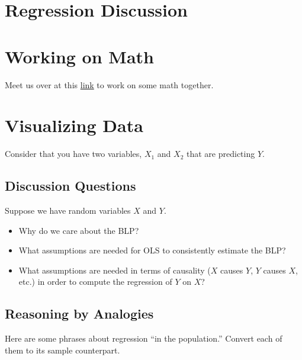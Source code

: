 \documentclass[
]{book}
\providecommand{\tightlist}{%
  \setlength{\itemsep}{0pt}\setlength{\parskip}{0pt}}
\theoremstyle{definition}
\theoremstyle{definition}
\theoremstyle{definition}
\theoremstyle{definition}
\theoremstyle{remark}
\begin{document}
\hypertarget{regression-discussion}{%
\section{Regression Discussion}\label{regression-discussion}}

\hypertarget{working-on-math}{%
\section{Working on Math}\label{working-on-math}}

Meet us over at this \href{https://miro.com/welcomeonboard/OWZ3SHlpeVBMYjdnc2xXUFhzQVNWaFpnTkg2dmF1Z3I1UUJBWVZobWFOeVduSHJNTTRSQUt3akVyQUt0MnAyM3wzNDU4NzY0NTE4MDA4MjA1NTc3?invite_link_id=319921528710}{link} to work on some math together.

\hypertarget{visualizing-data}{%
\section{Visualizing Data}\label{visualizing-data}}

Consider that you have two variables, \(X_{1}\) and \(X_{2}\) that are predicting \(Y\).

\hypertarget{discussion-questions-1}{%
\subsection{Discussion Questions}\label{discussion-questions-1}}

Suppose we have random variables \(X\) and \(Y\).

\begin{itemize}
\tightlist
\item
  Why do we care about the BLP?
\item
  What assumptions are needed for OLS to consistently estimate the BLP?
\item
  What assumptions are needed in terms of causality (\(X\) causes \(Y\), \(Y\) causes \(X\), etc.) in order to compute the regression of \(Y\) on \(X\)?
\end{itemize}

\hypertarget{reasoning-by-analogies}{%
\subsection{Reasoning by Analogies}\label{reasoning-by-analogies}}

Here are some phrases about regression ``in the population.'' Convert each of them to its sample counterpart.
\end{document}

